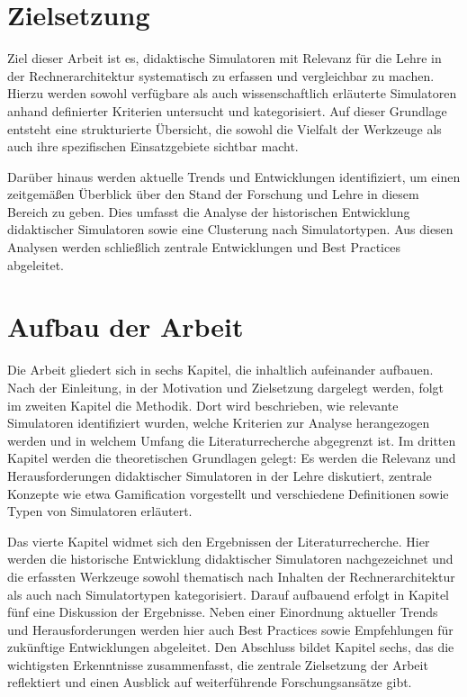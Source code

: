 \section{Zielsetzung}

Ziel dieser Arbeit ist es, didaktische Simulatoren mit Relevanz für die Lehre in der Rechnerarchitektur systematisch zu erfassen und vergleichbar zu machen. Hierzu werden sowohl verfügbare als auch wissenschaftlich erläuterte Simulatoren anhand definierter Kriterien untersucht und kategorisiert. Auf dieser Grundlage entsteht eine strukturierte Übersicht, die sowohl die Vielfalt der Werkzeuge als auch ihre spezifischen Einsatzgebiete sichtbar macht.

Darüber hinaus werden aktuelle Trends und Entwicklungen identifiziert, um einen zeitgemäßen Überblick über den Stand der Forschung und Lehre in diesem Bereich zu geben. Dies umfasst die Analyse der historischen Entwicklung didaktischer Simulatoren sowie eine Clusterung nach Simulatortypen. Aus diesen Analysen werden schließlich zentrale Entwicklungen und Best Practices abgeleitet.

\section{Aufbau der Arbeit}

Die Arbeit gliedert sich in sechs Kapitel, die inhaltlich aufeinander aufbauen. Nach der Einleitung, in der Motivation und Zielsetzung dargelegt werden, folgt im zweiten Kapitel die Methodik. Dort wird beschrieben, wie relevante Simulatoren identifiziert wurden, welche Kriterien zur Analyse herangezogen werden und in welchem Umfang die Literaturrecherche abgegrenzt ist. Im dritten Kapitel werden die theoretischen Grundlagen gelegt: Es werden die Relevanz und Herausforderungen didaktischer Simulatoren in der Lehre diskutiert, zentrale Konzepte wie etwa Gamification vorgestellt und verschiedene Definitionen sowie Typen von Simulatoren erläutert.

Das vierte Kapitel widmet sich den Ergebnissen der Literaturrecherche. Hier werden die historische Entwicklung didaktischer Simulatoren nachgezeichnet und die erfassten Werkzeuge sowohl thematisch nach Inhalten der Rechnerarchitektur als auch nach Simulatortypen kategorisiert. Darauf aufbauend erfolgt in Kapitel fünf eine Diskussion der Ergebnisse. Neben einer Einordnung aktueller Trends und Herausforderungen werden hier auch Best Practices sowie Empfehlungen für zukünftige Entwicklungen abgeleitet. Den Abschluss bildet Kapitel sechs, das die wichtigsten Erkenntnisse zusammenfasst, die zentrale Zielsetzung der Arbeit reflektiert und einen Ausblick auf weiterführende Forschungsansätze gibt.
